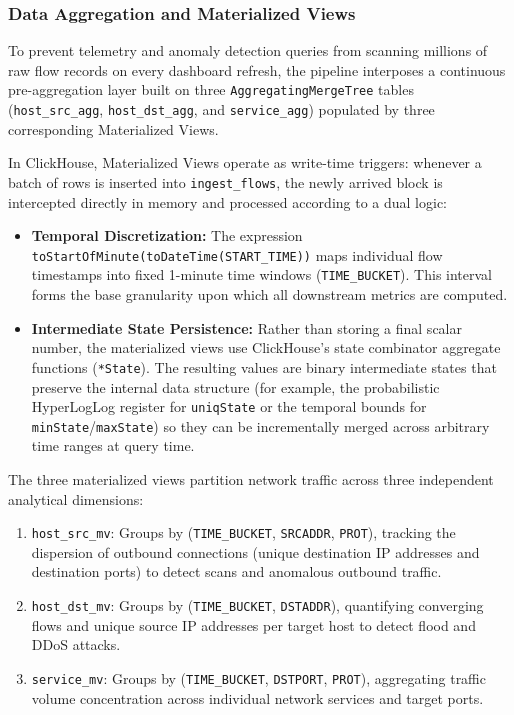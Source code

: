 \documentclass[11pt,a4paper]{article}
\begin{document}
\subsubsection{Data Aggregation and Materialized Views}
To prevent telemetry and anomaly detection queries from scanning millions of raw flow records on every dashboard refresh, the pipeline interposes a continuous pre-aggregation layer built on three \texttt{AggregatingMergeTree} tables (\texttt{host\_src\_agg}, \texttt{host\_dst\_agg}, and \texttt{service\_agg}) populated by three corresponding Materialized Views.

In ClickHouse, Materialized Views operate as write-time triggers: whenever a batch of rows is inserted into \texttt{ingest\_flows}, the newly arrived block is intercepted directly in memory and processed according to a dual logic:
\begin{itemize}
    \item \textbf{Temporal Discretization:} The expression \texttt{toStartOfMinute(toDateTime(START\_TIME))} maps individual flow timestamps into fixed 1-minute time windows (\texttt{TIME\_BUCKET}). This interval forms the base granularity upon which all downstream metrics are computed.
    \item \textbf{Intermediate State Persistence:} Rather than storing a final scalar number, the materialized views use ClickHouse's state combinator aggregate functions (\texttt{*State}). The resulting values are binary intermediate states that preserve the internal data structure (for example, the probabilistic HyperLogLog register for \texttt{uniqState} or the temporal bounds for \texttt{minState}/\texttt{maxState}) so they can be incrementally merged across arbitrary time ranges at query time.
\end{itemize}

The three materialized views partition network traffic across three independent analytical dimensions:
\begin{enumerate}
    \item \texttt{host\_src\_mv}: Groups by (\texttt{TIME\_BUCKET}, \texttt{SRCADDR}, \texttt{PROT}), tracking the dispersion of outbound connections (unique destination IP addresses and destination ports) to detect scans and anomalous outbound traffic.
    \item \texttt{host\_dst\_mv}: Groups by (\texttt{TIME\_BUCKET}, \texttt{DSTADDR}), quantifying converging flows and unique source IP addresses per target host to detect flood and DDoS attacks.
    \item \texttt{service\_mv}: Groups by (\texttt{TIME\_BUCKET}, \texttt{DSTPORT}, \texttt{PROT}), aggregating traffic volume concentration across individual network services and target ports.
\end{enumerate}
\end{document}
